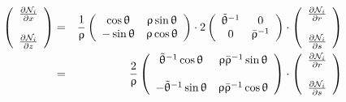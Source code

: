 \begin{eqnarray}
\left(
\begin{array}{c}
\frac{\partial {\mathcal{N}}_i}{\partial x} \\ \\
\frac{\partial {\mathcal{N}}_i}{\partial z} 
\end{array}
\right)
&=&
\frac{1}{\uprho}
\left(
\begin{array}{cc}
\cos \uptheta & \uprho\sin\uptheta \\ 
-\sin\uptheta & \uprho\cos\uptheta
\end{array}
\right)
\cdot
2
\left(
\begin{array}{cc}
\tilde{\uptheta}^{-1} & 0 \\
0 &  \bar{\uprho}^{-1}
\end{array}
\right)
\cdot 
\left(
\begin{array}{c}
\frac{\partial {\mathcal{N}}_i}{\partial r} \\ \\
\frac{\partial {\mathcal{N}}_i}{\partial s} 
\end{array}
\right)  \nonumber\\
&=&
\frac{2}{\uprho}
\left(
\begin{array}{cc}
\tilde{\uptheta}^{-1} \cos\uptheta & \uprho \bar{\uprho}^{-1} \sin \uptheta\\ \\
-\tilde{\uptheta}^{-1} \sin\uptheta & \uprho \bar{\uprho}^{-1} \cos \uptheta
\end{array}
\right)
\cdot 
\left(
\begin{array}{c}
\frac{\partial {\mathcal{N}}_i}{\partial r} \\ \\
\frac{\partial {\mathcal{N}}_i}{\partial s} 
\end{array}
\right)  
\end{eqnarray}


